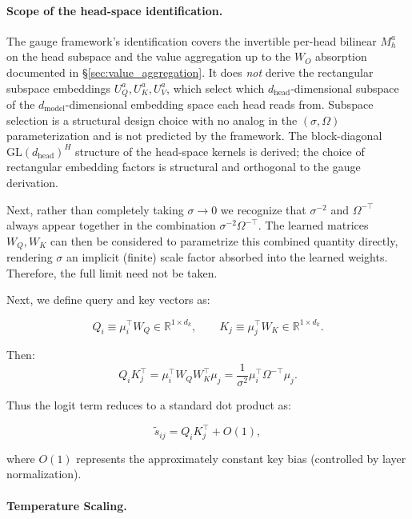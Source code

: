 \documentclass[twoside,11pt]{article}
\begin{document}
\paragraph{Scope of the head-space identification.} The gauge framework's identification covers the invertible per-head bilinear $M_h^a$ on the head subspace and the value aggregation up to the $W_O$ absorption documented in §\ref{sec:value_aggregation}. It does \emph{not} derive the rectangular subspace embeddings $U_Q^a, U_K^a, U_V^a$, which select which $d_{\mathrm{head}}$-dimensional subspace of the $d_{\mathrm{model}}$-dimensional embedding space each head reads from. Subspace selection is a structural design choice with no analog in the $(\sigma, \Omega)$ parameterization and is not predicted by the framework. The block-diagonal $\mathrm{GL}(d_{\mathrm{head}})^H$ structure of the head-space kernels is derived; the choice of rectangular embedding factors is structural and orthogonal to the gauge derivation.

Next, rather than completely taking $\sigma \to 0$ we recognize that $\sigma^{-2}$ and $\Omega^{-\top}$ always appear together in the combination $\sigma^{-2}\Omega^{-\top}$. The learned matrices $W_Q, W_K$ can then be considered to parametrize this combined quantity directly, rendering $\sigma$ an implicit (finite) scale factor absorbed into the learned weights. Therefore, the full limit need not be taken.

Next, we define query and key vectors as:

\begin{equation}
Q_i \equiv \mu_i^\top W_Q \in \mathbb{R}^{1\times d_k}, \qquad K_j \equiv \mu_j^\top W_K \in \mathbb{R}^{1\times d_k}.
\end{equation}

Then:
\begin{equation}
Q_i K_j^\top = \mu_i^\top W_Q W_K^\top \mu_j = \frac{1}{\sigma^2}\mu_i^\top \Omega^{-\top} \mu_j.
\end{equation}

Thus the logit term reduces to a standard dot product as:

\begin{equation}
\tilde{s}_{ij} = Q_i K_j^\top + O(1),
\end{equation}

where $O(1)$ represents the approximately constant key bias (controlled by layer normalization).

\paragraph{Temperature Scaling.}
\end{document}
